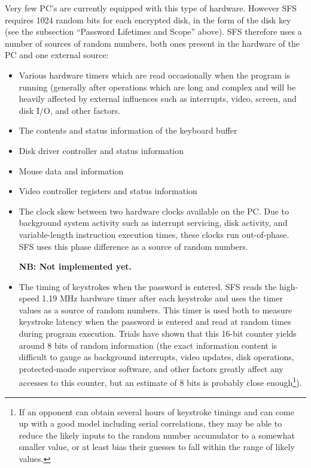 Very few PC's are currently equipped with this type of hardware.  However SFS
requires 1024 random bits for each encrypted disk, in the form of the disk key
(see the subsection ``Password Lifetimes and Scope'' above).  SFS therefore uses a
number of sources of random numbers, both ones present in the hardware of the
PC and one external source:

\begin{itemize}

\item Various hardware timers which are read occasionally when the program is
    running (generally after operations which are long and complex and will be
    heavily affected by external influences such as interrupts, video, screen,
    and disk I/O, and other factors.

\item The contents and status information of the keyboard buffer

\item Disk driver controller and status information

\item Mouse data and information

\item Video controller registers and status information

\item The clock skew between two hardware clocks available on the PC.  Due to
    background system activity such as interrupt servicing, disk activity, and
    variable-length instruction execution times, these clocks run out-of-phase.
    SFS uses this phase difference as a source of random numbers. 

    {\bf NB: Not implemented yet.}

\item The timing of keystrokes when the password is entered.  SFS reads the
    high-speed 1.19 MHz hardware timer after each keystroke and uses the timer
    values as a source of random numbers.  This timer is used both to measure
    keystroke latency when the password is entered and read at random times
    during program execution.  Trials have shown that this 16-bit counter
    yields around 8 bits of random information (the exact information content
    is difficult to gauge as background interrupts, video updates, disk
    operations, protected-mode supervisor software, and other factors greatly
    affect any accesses to this counter, but an estimate of 8 bits is probably
    close enough\footnote{
              If an opponent can obtain several hours of keystroke timings and
              can come up with a good model including serial correlations, they
              may be able to reduce the likely inputs to the random number
              accumulator to a somewhat smaller value, or at least bias their
              guesses to fall within the range of likely values.
}).


\end{itemize}
